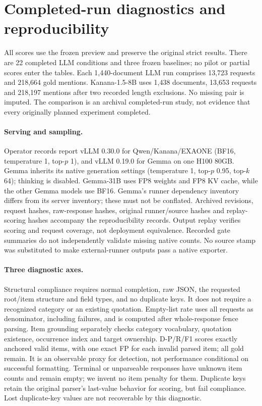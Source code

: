 \section{Completed-run diagnostics and reproducibility}
\label{app:diagnostics}

All scores use the frozen preview and preserve the original strict results. There are 22 completed LLM conditions and three frozen baselines; no pilot or partial scores enter the tables. Each 1,440-document LLM run comprises 13,723 requests and 218,664 gold mentions. Kanana-1.5-8B uses 1,438 documents, 13,653 requests and 218,197 mentions after two recorded length exclusions. No missing pair is imputed. The comparison is an archival completed-run study, not evidence that every originally planned experiment completed.

\paragraph{Serving and sampling.}
Operator records report vLLM 0.30.0 for Qwen/Kanana/EXAONE (BF16, temperature 1, top-$p$ 1), and vLLM 0.19.0 for Gemma on one H100 80GB. Gemma inherits its native generation settings (temperature 1, top-$p$ 0.95, top-$k$ 64); thinking is disabled. Gemma-31B uses FP8 weights and FP8 KV cache, while the other Gemma models use BF16. Gemma's runner dependency inventory differs from its server inventory; these must not be conflated. Archived revisions, request hashes, raw-response hashes, original runner/source hashes and replay-scoring hashes accompany the reproducibility records. Output replay verifies scoring and request coverage, not deployment equivalence. Recorded gate summaries do not independently validate missing native counts. No source stamp was substituted to make external-runner outputs pass a native exporter.

\paragraph{Three diagnostic axes.}
Structural compliance requires normal completion, raw JSON, the requested root/item structure and field types, and no duplicate keys. It does not require a recognized category or an existing quotation. Empty-list rate uses all requests as denominator, including failures, and is computed after whole-response fence parsing. Item grounding separately checks category vocabulary, quotation existence, occurrence index and target ownership. D-P/R/F1 scores exactly anchored valid items, with one exact FP for each invalid parsed item; all gold remain. It is an observable proxy for detection, not performance conditional on successful formatting. Terminal or unparseable responses have unknown item counts and remain empty; we invent no item penalty for them. Duplicate keys retain the original parser's last-value behavior for scoring, but fail compliance. Lost duplicate-key values are not recoverable by this diagnostic.

